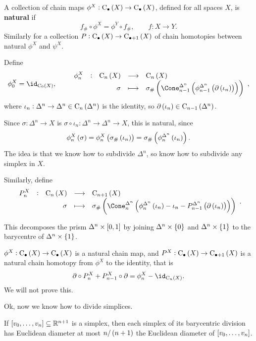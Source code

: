 \begin{definition*}
A collection of chain maps $ \phi^X : \C_\bullet\br{X} \to \C_\bullet\br{X} $, defined for all spaces $ X $, is \textbf{natural} if
$$ f_\# \circ \phi^X = \phi^Y \circ f_\#, \qquad f : X \to Y. $$
Similarly for a collection $ P : \C_\bullet\br{X} \to \C_{\bullet + 1}\br{X} $ of chain homotopies between natural $ \phi^X $ and $ \psi^X $.
\end{definition*}

\pagebreak

\begin{definition*}
Define
$$ \phi_0^X = \id_{\C_0\br{X}}, \qquad \function[\phi_n^X]{\C_n\br{X}}{\C_n\br{X}}{\sigma}{\sigma_\#\br{\Cone_{n - 1}^{\Delta^n}\br{\phi_{n - 1}^{\Delta^n}\br{\da\br{\iota_n}}}}}, $$
where $ \iota_n : \Delta^n \to \Delta^n \in \C_n\br{\Delta^n} $ is the identity, so $ \da\br{\iota_n} \in \C_{n - 1}\br{\Delta^n} $.
\end{definition*}

Since $ \sigma : \Delta^n \to X $ is $ \sigma \circ \iota_n : \Delta^n \to \Delta^n \to X $, this is natural, since
$$ \phi_n^X\br{\sigma} = \phi_n^X\br{\sigma_\#\br{\iota_n}} = \sigma_\#\br{\phi_n^{\Delta^n}\br{\iota_n}}. $$
The idea is that we know how to subdivide $ \Delta^n $, so know how to subdivide any simplex in $ X $.

\begin{definition*}
Similarly, define
$$ \function[P_n^X]{\C_n\br{X}}{\C_{n + 1}\br{X}}{\sigma}{\sigma_\#\br{\Cone_n^{\Delta^n}\br{\phi_n^{\Delta^n}\br{\iota_n} - \iota_n - P_{n - 1}^{\Delta^n}\br{\da\br{\iota_n}}}}}. $$
\end{definition*}

This decomposes the prism $ \Delta^n \times \sbr{0, 1} $ by joining $ \Delta^n \times \cbr{0} $ and $ \Delta^n \times \cbr{1} $ to the barycentre of $ \Delta^n \times \cbr{1} $.

\begin{fact*}
$ \phi^X : \C_\bullet\br{X} \to \C_\bullet\br{X} $ is a natural chain map, and $ P^X : \C_\bullet\br{X} \to \C_{\bullet + 1}\br{X} $ is a natural chain homotopy from $ \phi^X $ to the identity, that is
$$ \da \circ P_n^X + P_{n - 1}^X \circ \da = \phi_n^X - \id_{\C_n\br{X}}. $$
We will not prove this.
\end{fact*}

Ok, now we know how to divide simplices.

\begin{lemma}
If $ \sbr{v_0, \dots, v_n} \subseteq \RR^{n + 1} $ is a simplex, then each simplex of its barycentric division has Euclidean diameter at most $ n / \br{n + 1} $ the Euclidean diameter of $ \sbr{v_0, \dots, v_n} $.
\end{lemma}

